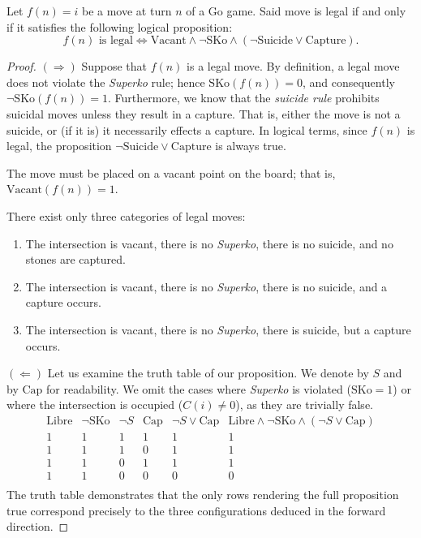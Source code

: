 \begin{theorem}\label{teoremalegal}
	Let \(f(n) = i\) be a move at turn \(n\) of a Go game. Said move is legal if and only if it satisfies the following logical proposition:
	$$f(n) \text{ is legal} \iff \text{Vacant} \wedge \neg \text{SKo} \wedge (\neg \text{Suicide} \vee \text{Capture}).$$
	\end{theorem}

\begin{proof}
	
	\((\Rightarrow)\) Suppose that \(f(n)\) is a legal move.
	By definition, a legal move does not violate the \textit{Superko} rule; hence \(\text{SKo}(f(n))=0\), and consequently \(\neg\text{SKo}(f(n))=1\).
	Furthermore, we know that the \textit{suicide rule} prohibits suicidal moves unless they result in a capture. That is, either the move is not a suicide, or (if it is) it necessarily effects a capture. In logical terms, since \(f(n)\) is legal, the proposition \(\neg\text{Suicide} \vee \text{Capture}\) is always true.
	
	The move must be placed on a vacant point on the board; that is, \(\text{Vacant}(f(n))=1\).
	
	
	There exist only three categories of legal moves:
	\begin{enumerate}
		\item The intersection is vacant, there is no \textit{Superko}, there is no suicide, and no stones are captured.
		\item The intersection is vacant, there is no \textit{Superko}, there is no suicide, and a capture occurs.
		\item The intersection is vacant, there is no \textit{Superko}, there is suicide, but a capture occurs.
	\end{enumerate}
	\((\Leftarrow)\) Let us examine the truth table of our proposition. We denote  by \(S\) and  by \(\text{Cap}\) for readability. We omit the cases where \textit{Superko} is violated (\(\text{SKo}=1\)) or where the intersection is occupied (\(C(i) \neq 0\)), as they are trivially false.
	\[
	\begin{array}{c|c|c|c|c|c}
		\text{Libre} & \neg \text{SKo} & \neg S & \text{Cap} & \neg S \vee \text{Cap} & \text{Libre} \wedge \neg \text{SKo} \wedge (\neg S \vee \text{Cap}) \\ 
		\hline 
		1 & 1 & 1 & 1 & 1 & 1 \\
		1 & 1 & 1 & 0 & 1 & 1 \\
		1 & 1 & 0 & 1 & 1 & 1 \\
		1 & 1 & 0 & 0 & 0 & 0 \\
	\end{array}
	\]
	The truth table demonstrates that the only rows rendering the full proposition true correspond precisely to the three configurations deduced in the forward direction.
\end{proof}

